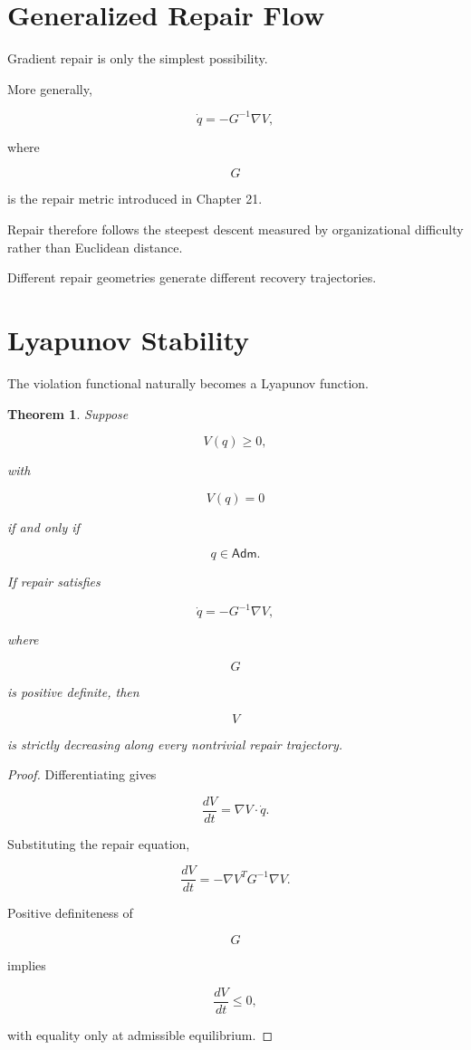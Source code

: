 \documentclass[11pt,oneside]{book}
\numberwithin{equation}{chapter}
\theoremstyle{definition}
\theoremstyle{plain}
\newtheorem{theorem}[definition]{Theorem}
\newcommand{\Adm}{\mathsf{Adm}}
\begin{document}
\section{Generalized Repair Flow}

Gradient repair is only the simplest possibility.

More generally,

\[
\dot q
=
-
G^{-1}
\nabla V,
\]

where

\[
G
\]

is the repair metric introduced in Chapter 21.

Repair therefore follows the steepest descent measured by organizational
difficulty rather than Euclidean distance.

Different repair geometries generate different recovery trajectories.

\section{Lyapunov Stability}

The violation functional naturally becomes a Lyapunov function.

\begin{theorem}

Suppose

\[
V(q)\ge0,
\]

with

\[
V(q)=0
\]

if and only if

\[
q
\in
\Adm.
\]

If repair satisfies

\[
\dot q
=
-
G^{-1}\nabla V,
\]

where

\[
G
\]

is positive definite, then

\[
V
\]

is strictly decreasing along every nontrivial repair trajectory.

\end{theorem}

\begin{proof}

Differentiating gives

\[
\frac{dV}{dt}
=
\nabla V
\cdot
\dot q.
\]

Substituting the repair equation,

\[
\frac{dV}{dt}
=
-
\nabla V^{T}
G^{-1}
\nabla V.
\]

Positive definiteness of

\[
G
\]

implies

\[
\frac{dV}{dt}
\le0,
\]

with equality only at admissible equilibrium.

\end{proof}
\end{document}
